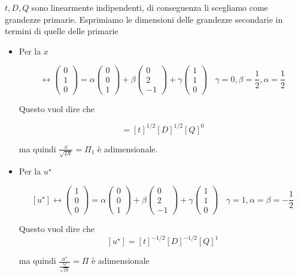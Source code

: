 \documentclass[10pt,a4paper,twoside,openright]{book}
\begin{document}
$t,D,Q$ sono linearmente indipendenti, di conseguenza li scegliamo come grandezze primarie. Esprimiamo le dimensioni delle grandezze secondarie in termini di quelle delle primarie
\begin{itemize}
\item Per la $x$

\begin{equation*}
[ x] \leftrightarrow \begin{pmatrix}
0\\
1\\
0
\end{pmatrix} =\alpha \begin{pmatrix}
0\\
0\\
1
\end{pmatrix} +\beta \begin{pmatrix}
0\\
2\\
-1
\end{pmatrix} +\gamma \begin{pmatrix}
1\\
1\\
0
\end{pmatrix} \ \ \ \ \gamma =0,\beta =\frac{1}{2},\alpha =\frac{1}{2}
\end{equation*}

Questo vuol dire che

\begin{equation*}
[ x] =[ t]^{1/2}[ D]^{1/2}[ Q]^{0}
\end{equation*}

ma quindi $\frac{x}{\sqrt{Dt}} =\Pi _{1}$ è adimensionale.
\item Per la $u^{\star }$

\begin{equation*}
\left[ u^{\star }\right] \leftrightarrow \begin{pmatrix}
1\\
0\\
0
\end{pmatrix} =\alpha \begin{pmatrix}
0\\
0\\
1
\end{pmatrix} +\beta \begin{pmatrix}
0\\
2\\
-1
\end{pmatrix} +\gamma \begin{pmatrix}
1\\
1\\
0
\end{pmatrix} \ \ \ \ \gamma =1,\alpha =\beta =-\frac{1}{2}
\end{equation*}

Questo vuol dire che\begin{equation*}
\left[ u^{\star }\right] =[ t]^{-1/2}[ D]^{-1/2}[ Q]^{1}
\end{equation*}

ma quindi $\frac{u^{\star }}{\frac{Q}{\sqrt{Dt}}} =\Pi $ è adimensionale
\end{itemize}
\end{document}
